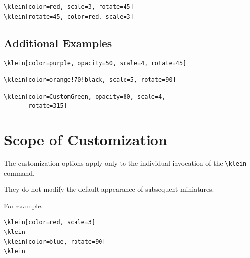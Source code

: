 \documentclass[12pt,a4paper]{article}
\begin{document}
\begin{verbatim}
\klein[color=red, scale=3, rotate=45]
\klein[rotate=45, color=red, scale=3]
\end{verbatim}

\begin{center}
    \klein[color=red,scale=3,rotate=45]
    \qquad
    \klein[rotate=45,color=red,scale=3]
\end{center}

\subsection{Additional Examples}

\begin{verbatim}
\klein[color=purple, opacity=50, scale=4, rotate=45]
\end{verbatim}

\begin{center}
    \klein[color=purple,opacity=50,scale=4,rotate=45]
\end{center}

\begin{verbatim}
\klein[color=orange!70!black, scale=5, rotate=90]
\end{verbatim}

\begin{center}
    \klein[color=orange!70!black,scale=5,rotate=90]
\end{center}

\begin{verbatim}
\klein[color=CustomGreen, opacity=80, scale=4,
       rotate=315]
\end{verbatim}

\begin{center}
    \klein[color=CustomGreen,opacity=80,scale=4,rotate=315]
\end{center}

\section{Scope of Customization}

The customization options apply only to the
individual invocation of the \verb|\klein| command.

They do not modify the default appearance of
subsequent miniatures.

For example:

\begin{verbatim}
\klein[color=red, scale=3]
\klein
\klein[color=blue, rotate=90]
\klein
\end{verbatim}
\end{document}

